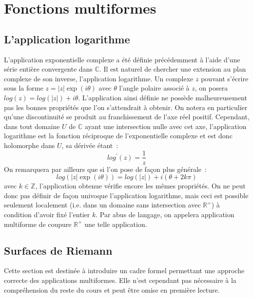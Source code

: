 \chapter{Fonctions multiformes}
\section{L'application logarithme} 
L'application exponentielle complexe a été définie précédemment à
l'aide d'une série entière convergente dans $\mathbb{C}$. Il est
naturel de chercher une extension au plan complexe de son inverse,
l'application logarithme. Un complexe $z$ pouvant s'écrire sous la
forme $z = |z| \exp (i \theta)$ avec $\theta$ l'angle polaire associé à
$z$, on posera $log(z) = log(|z|) + i \theta$. L'application ainsi
définie ne possède malheureusement pas les bonnes propriétés que l'on
s'attendrait à obtenir. On notera en particulier qu'une discontinuité
se produit au franchissement de l'axe réel positif. Cependant, dans tout
domaine $U$ de $\mathbb{C}$ ayant une intersection nulle avec cet axe,
l'application logarithme est la fonction réciproque de l'exponentielle
complexe et est donc holomorphe dans $U$, sa dérivée étant~:
\[
log^\prime(z) = \frac{1}{z}
\]
On remarquera par ailleurs que si l'on pose de façon plus générale~:
\[
log(|z| \exp(i \theta)) = log(|z|) + i ( \theta + 2 k \pi)
\]
avec $k \in \mathbb{Z}$, l'application obtenue vérifie encore les
mêmes propriétés. On ne peut donc pas définir de façon univoque
l'application logarithme, mais ceci est possible seulement localement
(i.e. dans un domaine sans intersection avec $\mathbb{R}^+$) à
condition d'avoir fixé l'entier $k$. Par abus de langage, on appelera
application multiforme de coupure $\mathbb{R}^+$ une telle
application.
\section{Surfaces de Riemann}
Cette section est destinée à introduire un cadre formel permettant une
approche correcte des applications multiformes. Elle n'est cependant
pas nécessaire à la compréhension du reste du cours et peut être omise
en première lecture.

